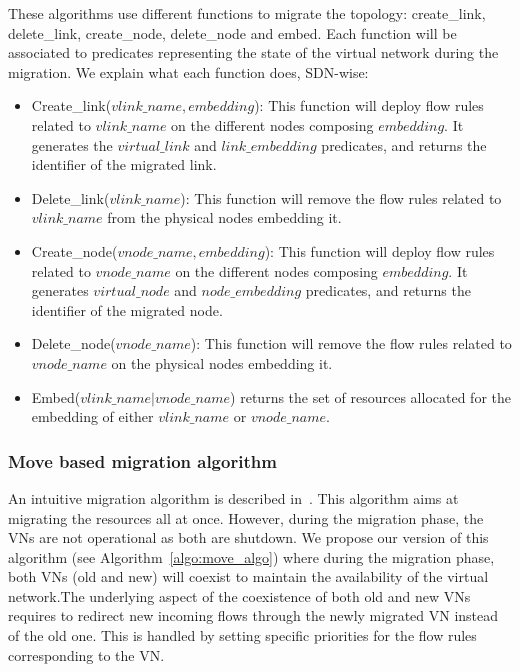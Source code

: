 These algorithms use different functions to migrate the topology: create\_link, delete\_link, create\_node, delete\_node and embed. 
Each function will be associated to predicates representing the state of the virtual network during the migration.
We explain what each function does, SDN-wise:

\begin{itemize}
\item Create\_link($vlink\_name,embedding$): This function will deploy flow rules related to $vlink\_name$ on the different nodes composing $embedding$. It generates the $virtual\_link$ and $link\_embedding$ predicates, and returns the identifier of the migrated link.
\item Delete\_link($vlink\_name$): This function will remove the flow rules related to $vlink\_name$ from the physical nodes embedding it.
\item Create\_node($vnode\_name,embedding$): This function will deploy flow rules related to $vnode\_name$ on the different nodes composing $embedding$. It generates $virtual\_node$ and $node\_embedding$ predicates, and returns the identifier of the migrated node.
\item Delete\_node($vnode\_name$): This function will remove the flow rules related to  $vnode\_name$ on the physical nodes embedding it.
\item Embed($vlink\_name \vert vnode\_name$) returns the set of resources allocated for the embedding of either $vlink\_name$ or $vnode\_name$. 
\end{itemize}



\subsubsection{Move based migration algorithm}
\label{sec:move-algo}

An intuitive migration algorithm is described in~\cite{Lime-Ghorbani2014}. 
This algorithm aims at migrating the resources all at once.
However, during the migration phase, the VNs are not operational as both are shutdown.
We propose our version of this algorithm (see Algorithm~\ref{algo:move_algo}) where during the migration phase, both VNs (old and new) will coexist to maintain the availability of the virtual network.The underlying aspect of the coexistence of both old and new VNs requires to redirect new incoming flows through the newly migrated VN instead of the old one.
This is handled by setting specific priorities for the flow rules corresponding to the VN.

